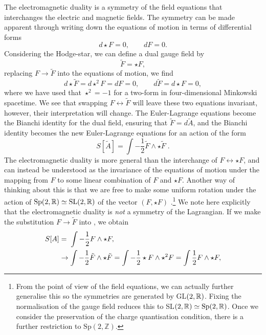 The electromagnetic duality is a symmetry of the field equations that interchanges the electric and magnetic fields. The symmetry can be made apparent through writing down the equations of motion in terms of differential forms
\begin{equation}
\label{eq:emdiffform}
	d\star F = 0, \qquad dF = 0.
\end{equation}
Considering the Hodge-star, we can define a dual gauge field by
\begin{equation*}
	\tilde{F} = \star F,
\end{equation*}
replacing $F \to \tilde{F}$ into the equations of motion, we find
\begin{equation*}
	d \star \tilde{F} = d \star^2 F = d F = 0, \qquad d \tilde{F} = d \star F = 0,
\end{equation*}
where we have used that $\star^2 = -1$ for a two-form in four-dimensional Minkowski spacetime. We see that swapping $F \leftrightarrow \tilde{F}$ will leave these two equations invariant, however, their interpretation will change. The Euler-Lagrange equations become the Bianchi identity for the dual field, ensuring that $\tilde{F} = d\tilde{A}$, and the Bianchi identity becomes the new Euler-Lagrange equations for an  action of the form
\begin{equation}
\label{eq:maxwelldual}
S[\tilde{A}] = \int - \frac{1}{2} \tilde{F} \wedge \star \tilde{F} \;.
\end{equation}
The electromagnetic duality is more general than the interchange of $F \leftrightarrow \star F$, and can instead be understood as the invariance of the equations of motion under the mapping from $F$ to some linear combination of $F$ and $\star F$. Another way of thinking about this is that we are free to make some uniform rotation under the action of $\text{Sp}(2, {\mathbb{R}}) \simeq \text{SL}(2, {\mathbb{R}})$ of the vector $(F, \star F)$ \cite{Mohaupt:2000mj}.\footnote{From the point of view of the field equations, we can actually further generalise this so the symmetries are generated by GL$(2,{\mathbb{R}})$. Fixing the normalisation of the gauge field reduces this to SL$(2, {\mathbb{R}}) \simeq \text{Sp}(2, {\mathbb{R}})$. Once we consider the preservation of the charge quantisation condition, there is a further restriction to $\text{Sp}(2,\mathbb{Z})$.} We note here explicitly that the electromagnetic duality is \emph{not} a symmetry of the Lagrangian. If we make the substitution $F \rightarrow \tilde{F}$ into , we obtain
\begin{equation*}
\begin{aligned}
	S[A] &= \; \int - \frac{1}{2} F \wedge \star F, \\
	&\to \int - \frac{1}{2} \tilde{F} \wedge \star \tilde{F} = \int - \frac{1}{2} \star {F} \wedge \star^2 F = \int \frac{1}{2} F \wedge \star F,
	\end{aligned}
\end{equation*}
